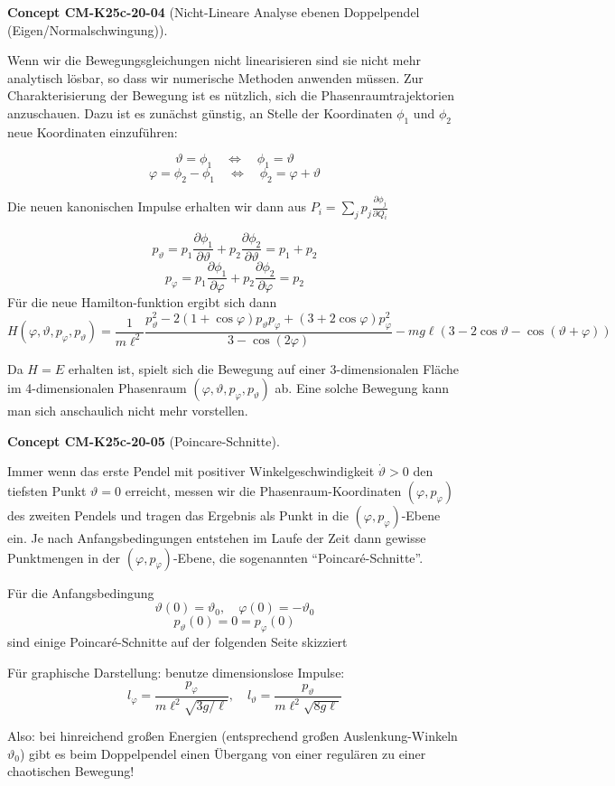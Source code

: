 \documentclass[10pt, letterpaper]{article}
\newcommand{\CustomHeading}[3]{%
  \par\medskip\noindent%
  \textbf{#1 #2} \textnormal{(#3)}.\enskip%
}
\newenvironment{CONC}[2]{\CustomHeading{Concept}{#1}{#2}}{}
\begin{document}
\begin{CONC}{CM-K25c-20-04}{Nicht-Lineare Analyse ebenen Doppelpendel (Eigen/Normalschwingung)}
Wenn wir die Bewegungsgleichungen nicht linearisieren sind sie nicht mehr analytisch lösbar, so dass wir numerische Methoden anwenden müssen. Zur Charakterisierung der Bewegung ist es nützlich, sich die Phasenraumtrajektorien anzuschauen. Dazu ist es zunächst günstig, an Stelle der Koordinaten $\phi_1$ und $\phi_2$ neue Koordinaten einzuführen:

\[\vartheta = \phi_1 \quad \Leftrightarrow \quad \phi_1 = \vartheta\]
\[\varphi = \phi_2-\phi_1 \quad \Leftrightarrow \quad \phi_2 = \varphi+\vartheta\]

Die neuen kanonischen Impulse erhalten wir dann aus $P_i = \sum_j p_j \frac{\partial \phi_j}{\partial Q_i}$

\[p_\vartheta = p_1 \frac{\partial \phi_1}{\partial \vartheta} + p_2 \frac{\partial \phi_2}{\partial \vartheta} = p_1 + p_2\]
\[p_\varphi = p_1 \frac{\partial \phi_1}{\partial \varphi} + p_2 \frac{\partial \phi_2}{\partial \varphi} = p_2\]
Für die neue Hamilton-funktion ergibt sich dann
\[H(\varphi,\vartheta,p_\varphi,p_\vartheta) = \frac{1}{m\ell^2}\frac{p_\vartheta^2-2(1+\cos\varphi)p_\vartheta p_\varphi+(3+2\cos\varphi)p_\varphi^2}{3-\cos(2\varphi)} - mg\ell(3-2\cos\vartheta-\cos(\vartheta+\varphi))\]

Da $H=E$ erhalten ist, spielt sich die Bewegung auf einer 3-dimensionalen Fläche im 4-dimensionalen Phasenraum $(\varphi,\vartheta,p_\varphi,p_\vartheta)$ ab. Eine solche Bewegung kann man sich anschaulich nicht mehr vorstellen.
\end{CONC}

\begin{CONC}{CM-K25c-20-05}{Poincare-Schnitte}
Immer wenn das erste Pendel mit positiver Winkelgeschwindigkeit $\dot{\vartheta}>0$ den tiefsten Punkt $\vartheta=0$ erreicht, messen wir die Phasenraum-Koordinaten $(\varphi,p_\varphi)$ des zweiten Pendels und tragen das Ergebnis als Punkt in die $(\varphi,p_\varphi)$-Ebene ein. Je nach Anfangsbedingungen entstehen im Laufe der Zeit dann gewisse Punktmengen in der $(\varphi,p_\varphi)$-Ebene, die sogenannten ``Poincaré-Schnitte''.

Für die Anfangsbedingung
\[\vartheta(0)=\vartheta_0, \quad \varphi(0)=-\vartheta_0\]
\[p_\vartheta(0)=0=p_\varphi(0)\]
sind einige Poincaré-Schnitte auf der folgenden Seite skizziert


Für graphische Darstellung: benutze dimensionslose Impulse:
\[l_\varphi = \frac{p_\varphi}{m\ell^2\sqrt{3g/\ell}}, \quad l_\vartheta = \frac{p_\vartheta}{m\ell^2\sqrt{8g\ell}}\]



\noindent Also: bei hinreichend großen Energien (entsprechend großen Auslenkung-Winkeln $\vartheta_0$) gibt es beim Doppelpendel einen Übergang von einer regulären zu einer chaotischen Bewegung!
\end{CONC}
\end{document}
